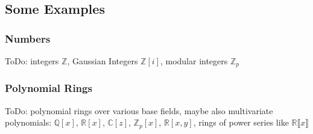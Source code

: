 






\subsection{Some Examples}


\subsubsection{Numbers}
ToDo: integers $\mathbb{Z}$, Gaussian Integers $\mathbb{Z}[i]$, modular integers $\mathbb{Z}_p$

\subsubsection{Polynomial Rings}
ToDo: polynomial rings over various base fields, maybe also multivariate polynomials: $\mathbb{Q}[x]$, $\mathbb{R}[x]$, $\mathbb{C}[z]$, $\mathbb{Z}_p[x]$, $\mathbb{R}[x,y]$, rings of power series like
$\mathbb{R} \llbracket x \rrbracket$






